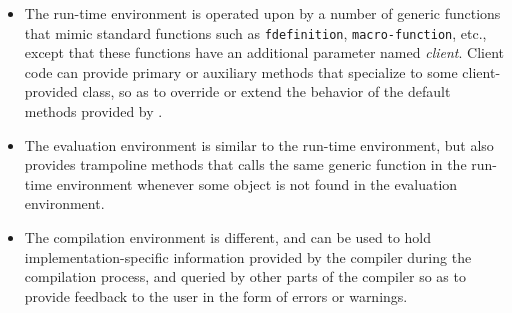 \begin{itemize}
\item The run-time environment is operated upon by a number of generic
  functions that mimic standard \commonlisp{} functions such as
  \texttt{fdefinition}, \texttt{macro-function}, etc., except that
  these functions have an additional parameter named \emph{client}.
  Client code can provide primary or auxiliary methods that specialize
  to some client-provided class, so as to override or extend the
  behavior of the default methods provided by \clostrum{}.
\item The evaluation environment is similar to the run-time
  environment, but also provides trampoline methods that calls the
  same generic function in the run-time environment whenever some
  object is not found in the evaluation environment.
\item The compilation environment is different, and can be used to
  hold implementation-specific information provided by the compiler
  during the compilation process, and queried by other parts of the
  compiler so as to provide feedback to the user in the form of errors
  or warnings. 
\end{itemize}
